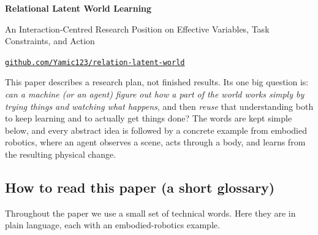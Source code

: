 \documentclass[11pt]{article}
\newenvironment{plainword}{%
  \par\medskip\noindent\begin{minipage}{\textwidth}%
  \color{gray!75!black}\small\itshape
}{%
  \end{minipage}\par\medskip}
\begin{document}
\begin{center}
{\LARGE\bfseries Relational Latent World Learning\par}
\end{center}

\begin{center}
{\large An Interaction-Centred Research Position on Effective Variables, Task Constraints, and Action\par}
\vspace{0.35em}
{\small\href{https://github.com/Yamic123/relation-latent-world}{\texttt{github.com/Yamic123/relation-latent-world}}\par}
\end{center}

\vspace{0.6em}
\begin{plainword}
This paper describes a research plan, not finished results. Its one big question is:
\emph{can a machine (or an agent) figure out how a part of the world works simply by trying things and watching what happens},
and then \emph{reuse} that understanding both to keep learning and to actually get things done? The words are kept
simple below, and every abstract idea is followed by a concrete example from embodied robotics, where an agent observes a scene,
acts through a body, and learns from the resulting physical change.
\end{plainword}

\subsection*{How to read this paper (a short glossary)}

Throughout the paper we use a small set of technical words. Here they are in plain language, each with an embodied-robotics example.
\end{document}
